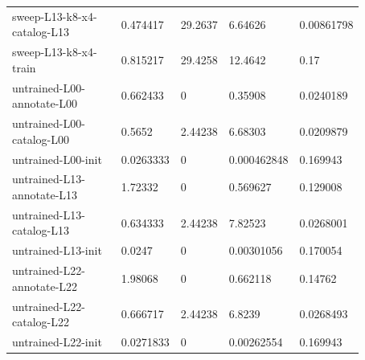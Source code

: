 \begin{longtable}{@{}L{0.39\linewidth}L{0.11\linewidth}L{0.12\linewidth}L{0.12\linewidth}L{0.13\linewidth}@{}}
sweep-L13-k8-x4-catalog-L13 & 0.474417 & 29.2637 & 6.64626 & 0.00861798 \\
sweep-L13-k8-x4-train & 0.815217 & 29.4258 & 12.4642 & 0.17 \\
untrained-L00-annotate-L00 & 0.662433 & 0 & 0.35908 & 0.0240189 \\
untrained-L00-catalog-L00 & 0.5652 & 2.44238 & 6.68303 & 0.0209879 \\
untrained-L00-init & 0.0263333 & 0 & 0.000462848 & 0.169943 \\
untrained-L13-annotate-L13 & 1.72332 & 0 & 0.569627 & 0.129008 \\
untrained-L13-catalog-L13 & 0.634333 & 2.44238 & 7.82523 & 0.0268001 \\
untrained-L13-init & 0.0247 & 0 & 0.00301056 & 0.170054 \\
untrained-L22-annotate-L22 & 1.98068 & 0 & 0.662118 & 0.14762 \\
untrained-L22-catalog-L22 & 0.666717 & 2.44238 & 6.8239 & 0.0268493 \\
untrained-L22-init & 0.0271833 & 0 & 0.00262554 & 0.169943 \\
\end{longtable}
